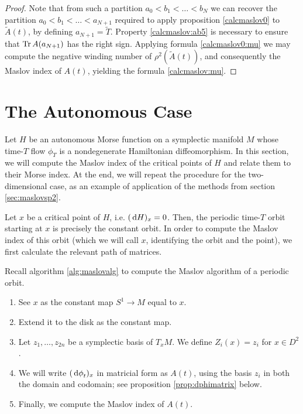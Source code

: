 \begin{proof}
Note that from such a partition $a_0 < b_1 < \dots < b_N$ we can recover the partition $a_0 < b_1 < \dots < a_{N+1}$ required to apply proposition \ref{calcmaslov0} to $\tilde A(t)$, by defining $a_{N+1} = \tilde T$. Property \ref{calcmaslov:ab5} is necessary to ensure that $\operatorname{Tr} A(a_{N+1})$ has the right sign. Applying formula \eqref{calcmaslov0:mu} we may compute the negative winding number of $\rho^2(\tilde A(t))$, and consequently the Maslov index of $A(t)$, yielding the formula \ref{calcmaslov:mu}.
\end{proof}

\section{The Autonomous Case}

Let $H$ be an autonomous Morse function on a symplectic manifold $M$ whose time-$T$ flow $\phi_T$ is a nondegenerate Hamiltonian diffeomorphism. In this section, we will compute the Maslov index of the critical points of $H$ and relate them to their Morse index. At the end, we will repeat the procedure for the two-dimensional case, as an example of application of the methods from section \ref{sec:maslovsp2}.

Let $x$ be a critical point of $H$, i.e. $(\dl H)_x = 0$. Then, the periodic time-$T$ orbit starting at $x$ is precisely the constant orbit. In order to compute the Maslov index of this orbit (which we will call $x$, identifying the orbit and the point), we first calculate the relevant path of matrices.

Recall algorithm \ref{alg:maslovalg} to compute the Maslov algorithm of a periodic orbit.
\begin{enumerate}[algorithm]
\item See $x$ as the constant map $S^1 \to M$ equal to $x$.
\item Extend it to the disk as the constant map.
\item Let $z_1, \dots, z_{2n}$ be a symplectic basis of $T_x M$. We define $Z_i(x) = z_i$ for $x \in D^2$.
\item We will write $(\dl \phi_t)_x$ in matricial form as $A(t)$, using the basis $z_i$ in both the domain and codomain; see proposition \ref{prop:dphimatrix} below.
\item Finally, we compute the Maslov index of $A(t)$.
\end{enumerate}

